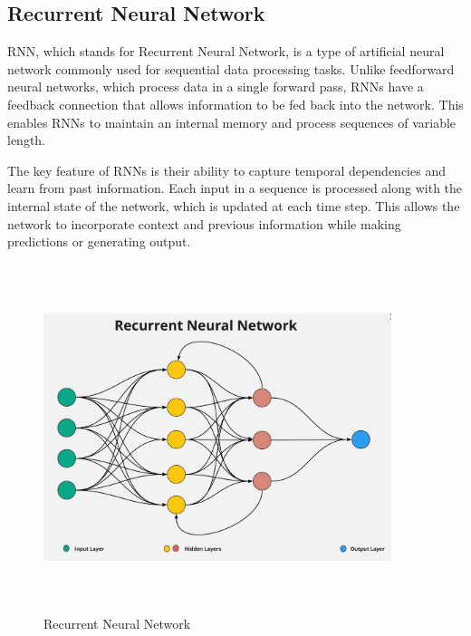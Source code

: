 \subsection{Recurrent Neural Network}
RNN, which stands for Recurrent Neural Network, is a type of artificial neural network commonly used for sequential data processing tasks. Unlike feedforward neural networks, which process data in a single forward pass, RNNs have a feedback connection that allows information to be fed back into the network. This enables RNNs to maintain an internal memory and process sequences of variable length.

The key feature of RNNs is their ability to capture temporal dependencies and learn from past information. Each input in a sequence is processed along with the internal state of the network, which is updated at each time step. This allows the network to incorporate context and previous information while making predictions or generating output.


\begin{figure}[h]
    \centering
    \includegraphics[height=4in,width= 4in ]{img/RNN.png}
    \caption{Recurrent Neural Network}
\end{figure}